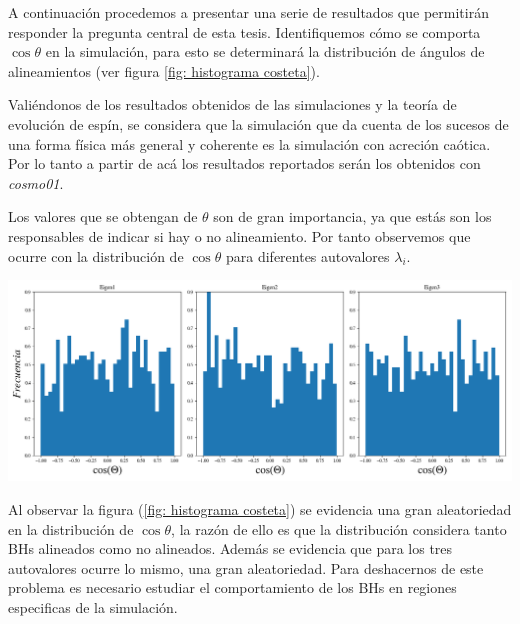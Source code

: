 
A continuación procedemos a presentar una serie de resultados que permitirán responder la pregunta central de esta tesis.
Identifiquemos cómo se comporta $\cos \theta $ en la simulación, para esto se determinará la distribución de ángulos de alineamientos (ver figura \ref{fig: histograma costeta}). 

Valiéndonos de los resultados obtenidos de las simulaciones y  la teoría de evolución de espín, se considera que la simulación que da cuenta de los sucesos de una forma física más general y coherente es la simulación con acreción caótica. Por lo tanto a partir de acá los resultados reportados serán los obtenidos con {\it{cosmo01}}. 




Los valores que se obtengan de $\theta$ son de gran importancia, ya que estás son los responsables de indicar si hay o no alineamiento. Por tanto observemos que ocurre con la distribución de $\cos \theta$ para diferentes autovalores $\lambda_{i}$.
%
\begin{center}
\includegraphics[scale=.37]{./figures/6_Resultados/cosmo01/histograma_cos_theta.png}
\label{fig: histograma costeta}
\end{center}
%
Al observar la figura (\ref{fig: histograma costeta}) se evidencia una gran aleatoriedad en la distribución de $\cos\theta$, la razón de ello es que la distribución considera tanto BHs alineados como no alineados. Además se evidencia que para los tres autovalores ocurre lo mismo, una gran aleatoriedad. Para deshacernos de este problema es necesario estudiar el comportamiento de los BHs en regiones especificas de la simulación.

